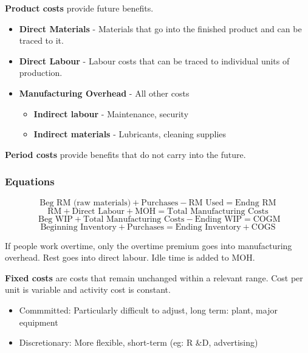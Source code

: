 \documentclass[english, 12pt]{article}
\begin{document}
\begin{defn}
\textbf{Product costs} provide future benefits.
\begin{itemize}
\item \textbf{Direct Materials} - Materials that go into the finished product and can be traced to it.
\item \textbf{Direct Labour} - Labour costs that can be traced to individual units of production.
\item \textbf{Manufacturing Overhead} - All other costs
\begin{itemize}
\item \textbf{Indirect labour} - Maintenance, security
\item \textbf{Indirect materials} - Lubricants, cleaning supplies
\end{itemize}
\end{itemize}
\end{defn}
\begin{defn}
\textbf{Period costs} provide benefits that do not carry into the future.
\end{defn}

\subsubsection*{Equations}
\[ \text{Beg RM (raw materials)} + \text{Purchases} - \text{RM Used} = \text{Endng RM} \]
\[\text{RM} + \text{Direct Labour} + \text{MOH} = \text{Total Manufacturing Costs}\]
\[\text{ Beg WIP} + \text{Total Manufacturing Costs} - \text{Ending WIP} = \text{COGM}\]
\[ \text{Beginning Inventory} + \text{Purchases} = \text{Ending Inventory} + \text{COGS}\]

\begin{note}
If people work overtime, only the overtime premium goes into manufacturing overhead. Rest goes into direct labour. Idle time is added to MOH.
\end{note}

\begin{defn}
\textbf{Fixed costs} are costs that remain unchanged within a relevant range. Cost per unit is variable and activity cost is constant.
\begin{itemize}
\item Commmitted: Particularly difficult to adjust, long term: plant, major equipment
\item Discretionary: More flexible, short-term (eg: R \&D, advertising)
\end{itemize}
\end{defn}
\end{document}
